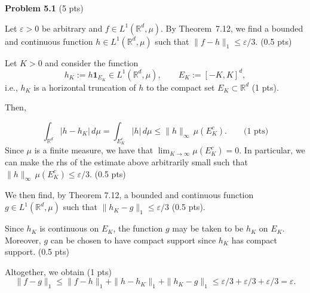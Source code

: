 
\textbf{Problem 5.1} (5 pts)

Let $\varepsilon>0$ be arbitrary and $f\in L^1(\mathbb{R}^d,\mu)$. By Theorem~7.12, we find a bounded and continuous function $h\in L^1(\mathbb{R}^d,\mu)$ such that $\|f-h\|_1 \le \varepsilon/3$. (0.5 pts)

Let $K>0$ and consider the function 
\[
	h_K:=h\mathbf{1}_{E_K} \in L^1(\mathbb{R}^d,\mu),\qquad E_K:=[-K,K]^d,
\]
i.e., $h_K$ is a horizontal truncation of $h$ to the compact set $E_K\subset\mathbb{R}^d$ (1 pts). 

Then,

\[
	\int_{\mathbb{R}^d} |h-h_K|\,d\mu = \int_{E_K^c} |h|\,d\mu \le \|h\|_\infty\, \mu(E_K^c). \qquad \text{(1 pts)}
\]
Since $\mu$ is a finite measure, we have that $\lim_{K\to\infty} \mu(E_K^c)=0$. In particular, we can make the rhs of the estimate above arbitrarily small such that $\|h\|_\infty\, \mu(E_K^c) \le \varepsilon/3$. (0.5 pts)

We then find, by Theorem 7.12, a bounded and continuous function $g\in L^1(\mathbb{R}^d,\mu)$ such that $\|h_K-g\|_1\le \varepsilon/3$ (0.5 pts). 

Since $h_K$ is continuous on $E_K$, the function $g$ may be taken to be $h_K$ on $E_K$. Moreover, $g$ can be chosen to have compact support since $h_K$ has compact support. (0.5 pts)

Altogether, we obtain (1 pts)
\[
	\|f-g\|_1 \le \|f-h\|_1 + \|h-h_K\|_1 + \|h_K-g\|_1 \le \varepsilon/3 + \varepsilon/3 + \varepsilon/3 = \varepsilon.
\]   
